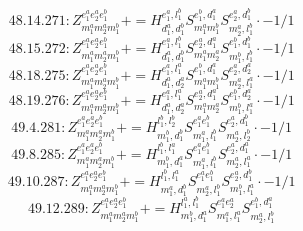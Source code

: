 \documentclass[letterpaper,10pt,fleqn,leqno,onecolumn]{article}
\begin{document}
\begin{equation} \;\;\;\;\;\;  48.14.271: Z^{e_{1}^{a}e_{2}^{a}e_{1}^{b}}_{m_{1}^{a}m_{2}^{a}m_{1}^{b}}+=H^{e_{1}^{a},l_{1}^{b}}_{d_{1}^{a},d_{1}^{b}}S^{e_{1}^{b},d_{1}^{a}}_{m_{1}^{a}m_{1}^{b}}S^{e_{2}^{a},d_{1}^{b}}_{m_{2}^{a},l_{1}^{b}}\cdot -1/1 \end{equation}
\begin{equation} \;\;\;\;\;\;  48.15.272: Z^{e_{1}^{a}e_{2}^{a}e_{1}^{b}}_{m_{1}^{a}m_{2}^{a}m_{1}^{b}}+=H^{e_{1}^{a},l_{1}^{b}}_{d_{1}^{a},d_{1}^{b}}S^{e_{2}^{a},d_{1}^{a}}_{m_{1}^{a}m_{2}^{a}}S^{e_{1}^{b},d_{1}^{b}}_{m_{1}^{b},l_{1}^{b}}\cdot -1/1 \end{equation}
\begin{equation} \;\;\;\;\;\;  48.18.275: Z^{e_{1}^{a}e_{2}^{a}e_{1}^{b}}_{m_{1}^{a}m_{2}^{a}m_{1}^{b}}+=H^{e_{1}^{a},l_{1}^{a}}_{d_{1}^{a},d_{2}^{a}}S^{e_{1}^{b},d_{1}^{a}}_{m_{1}^{a}m_{1}^{b}}S^{e_{2}^{a},d_{2}^{a}}_{m_{2}^{a},l_{1}^{a}}\cdot -1/1 \end{equation}
\begin{equation} \;\;\;\;\;\;  48.19.276: Z^{e_{1}^{a}e_{2}^{a}e_{1}^{b}}_{m_{1}^{a}m_{2}^{a}m_{1}^{b}}+=H^{e_{1}^{a},l_{1}^{a}}_{d_{1}^{a},d_{2}^{a}}S^{e_{2}^{a},d_{1}^{a}}_{m_{1}^{a}m_{2}^{a}}S^{e_{1}^{b},d_{2}^{a}}_{m_{1}^{b},l_{1}^{a}}\cdot -1/1 \end{equation}
\begin{equation} \;\;\;\;\;\;  49.4.281: Z^{e_{1}^{a}e_{2}^{a}e_{1}^{b}}_{m_{1}^{a}m_{2}^{a}m_{1}^{b}}+=H^{l_{1}^{b},l_{2}^{b}}_{m_{1}^{b},d_{1}^{b}}S^{e_{1}^{a}e_{1}^{b}}_{m_{1}^{a},l_{1}^{b}}S^{e_{2}^{a},d_{1}^{b}}_{m_{2}^{a},l_{2}^{b}}\cdot -1/1 \end{equation}
\begin{equation} \;\;\;\;\;\;  49.8.285: Z^{e_{1}^{a}e_{2}^{a}e_{1}^{b}}_{m_{1}^{a}m_{2}^{a}m_{1}^{b}}+=H^{l_{1}^{b},l_{1}^{a}}_{m_{1}^{b},d_{1}^{a}}S^{e_{1}^{a}e_{1}^{b}}_{m_{1}^{a},l_{1}^{b}}S^{e_{2}^{a},d_{1}^{a}}_{m_{2}^{a},l_{1}^{a}}\cdot -1/1 \end{equation}
\begin{equation} \;\;\;\;\;\;  49.10.287: Z^{e_{1}^{a}e_{2}^{a}e_{1}^{b}}_{m_{1}^{a}m_{2}^{a}m_{1}^{b}}+=H^{l_{1}^{b},l_{1}^{a}}_{m_{1}^{a},d_{1}^{b}}S^{e_{1}^{a}e_{1}^{b}}_{m_{2}^{a},l_{1}^{b}}S^{e_{2}^{a},d_{1}^{b}}_{m_{1}^{b},l_{1}^{a}}\cdot -1/1 \end{equation}
\begin{equation} \;\;\;\;\;\;  49.12.289: Z^{e_{1}^{a}e_{2}^{a}e_{1}^{b}}_{m_{1}^{a}m_{2}^{a}m_{1}^{b}}+=H^{l_{1}^{a},l_{1}^{b}}_{m_{1}^{b},d_{1}^{a}}S^{e_{1}^{a}e_{2}^{a}}_{m_{1}^{a},l_{1}^{a}}S^{e_{1}^{b},d_{1}^{a}}_{m_{2}^{a},l_{1}^{b}} \end{equation}
\end{document}
